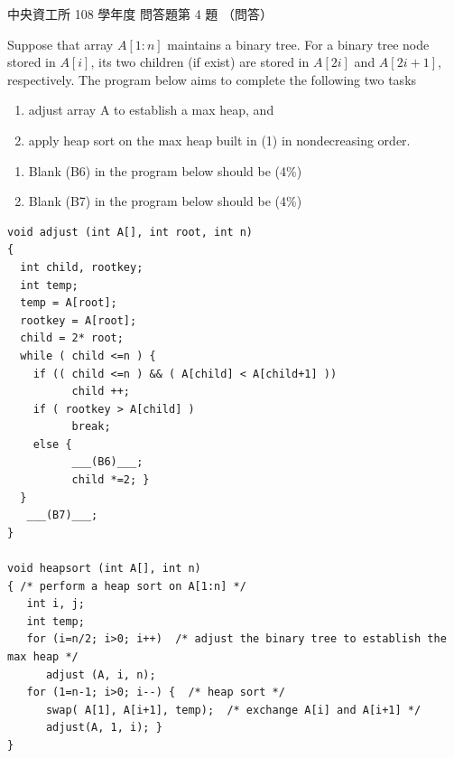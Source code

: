 \begin{pastexam}[label={px:ncu-108-dsa-16}]{中央資工所 108 學年度 問答題第 4 題}
（問答）

Suppose that array $A[1{:}n]$ maintains a binary tree. For a binary tree node stored in $A[i]$, its
two children (if exist) are stored in $A[2i]$ and $A[2i+1]$, respectively. The program below aims to
complete the following two tasks
\begin{enumerate}[label=\roman*.]
\item adjust array A to establish a max heap, and
\item apply heap sort on the max heap built in (1) in nondecreasing order.
\end{enumerate}
\begin{enumerate}[label=(\alph*)]
\item Blank (B6) in the program below should be\underline{\hspace{4em}} (4\%)
\item Blank (B7) in the program below should be \underline{\hspace{4em}} (4\%)
\end{enumerate}
\begin{verbatim}
void adjust (int A[], int root, int n)
{
  int child, rootkey;
  int temp;
  temp = A[root];
  rootkey = A[root];
  child = 2* root;
  while ( child <=n ) {
    if (( child <=n ) && ( A[child] < A[child+1] ))
          child ++;
    if ( rootkey > A[child] )
          break;
    else {
          ___(B6)___;
          child *=2; }
  }
   ___(B7)___;
}

void heapsort (int A[], int n)
{ /* perform a heap sort on A[1:n] */
   int i, j;
   int temp;
   for (i=n/2; i>0; i++)  /* adjust the binary tree to establish the max heap */
      adjust (A, i, n);
   for (1=n-1; i>0; i--) {  /* heap sort */
      swap( A[1], A[i+1], temp);  /* exchange A[i] and A[i+1] */
      adjust(A, 1, i); }
}
\end{verbatim}
\end{pastexam}


